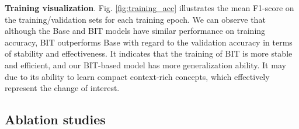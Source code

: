 \documentclass[journal]{IEEEtran}
\begin{document}
\begin{table}
    \centering
    \caption{Effect of the depth of the transformer. We perform analysis on the Encoder Depth (E.D.) and Decoder Depth (D.D.) of the BIT, and report the F1/IoU scores for each configuration on the LEVIR-CD, WHU-CD, and DSIFN-CD test sets.}
    \label{tab:transformer_depth}
\end{table}

\textbf{Training visualization}. Fig. \ref{fig:training_acc} illustrates the mean F1-score on the training/validation sets for each training epoch. We can observe that although the Base and BIT models have similar performance on training accuracy, BIT outperforms Base with regard to the validation accuracy in terms of stability and effectiveness. It indicates that the training of BIT is more stable and efficient, and our BIT-based model has more generalization ability. It may due to its ability to learn compact context-rich concepts, which effectively represent the change of interest. 

\subsection{Ablation studies}
\label{ssec:ablation}
\end{document}
